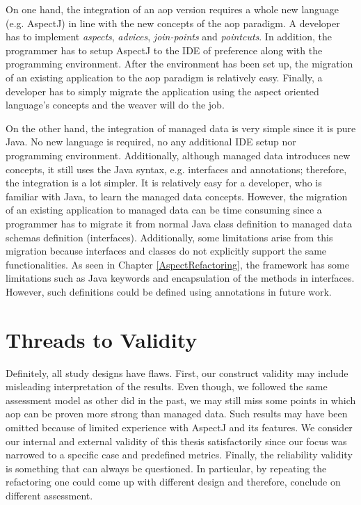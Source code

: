 On one hand, the integration of an \ac{aop} version requires a whole new language (e.g. AspectJ) in line with the new concepts of the \ac{aop} paradigm.
A developer has to implement \textit{aspects}, \textit{advices}, \textit{join-points} and \textit{pointcuts}. 
In addition, the programmer has to setup AspectJ to the IDE of preference along with the programming environment.
After the environment has been set up, the migration of an existing application to the \ac{aop} paradigm is relatively easy.
Finally, a developer has to simply migrate the application using the aspect oriented language's concepts and the weaver will do the job.

On the other hand, the integration of managed data is very simple since it is pure Java.
No new language is required, no any additional IDE setup nor programming environment.
Additionally, although managed data introduces new concepts, it still uses the Java syntax, e.g. interfaces and annotations; therefore, the integration is a lot simpler.
It is relatively easy for a developer, who is familiar with Java, to learn the managed data concepts.
However, the migration of an existing application to managed data can be time consuming since a programmer has to migrate it from normal Java class definition  to managed data schemas definition (interfaces).
Additionally, some limitations arise from this migration because interfaces and classes do not explicitly support the same functionalities.
As seen in Chapter \ref{AspectRefactoring}, the framework has some limitations such as Java keywords and encapsulation of the methods in interfaces.
However, such definitions could be defined using annotations in future work.

\section{Threads to Validity}
Definitely, all study designs have flaws.
First, our construct validity may include misleading interpretation of the results.
Even though, we followed the same assessment model as other did in the past, we may still miss some points in which \ac{aop} can be proven more strong than managed data.
Such results may have been omitted because of limited experience with AspectJ and its features.
We consider our internal and external validity of this thesis satisfactorily since our focus was narrowed to a specific case and predefined metrics.
Finally, the reliability validity is something that can always be questioned.
In particular, by repeating the refactoring one could come up with different design and therefore, conclude on different assessment.

